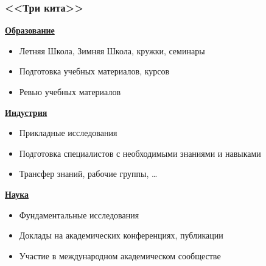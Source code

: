 \documentclass[xcolor=table,aspectratio=169]{beamer}
\begin{document}

\begin{frame}[fragile]
  \frametitle{<<Три кита>>}
  \begin{minipage}[t]{0.48\textwidth}
    \begin{center}
    \underline{\textbf{Образование}}
    \begin{itemize}
      \item Летняя Школа\footnotemark, Зимняя Школа, кружки, семинары
      \item Подготовка учебных материалов, курсов
      \item Ревью учебных материалов
    \end{itemize}
    \end{center}
  \end{minipage}
  \begin{minipage}[t]{0.48\textwidth}
    \begin{center}
    \underline{\textbf{Индустрия}}
    \begin{itemize}
      \item Прикладные исследования
      \item Подготовка специалистов с необходимыми знаниями и навыками
      \item Трансфер знаний, рабочие группы, \ldots
    \end{itemize}
    \end{center}
  \end{minipage}
  \begin{center}
  \underline{\textbf{Наука}}
  \begin{itemize}
      \item Фундаментальные исследования
      \item Доклады на академических конференциях, публикации
      \item Участие в международном академическом сообществе
  \end{itemize}
\end{center}
\end{frame}
\end{document}
